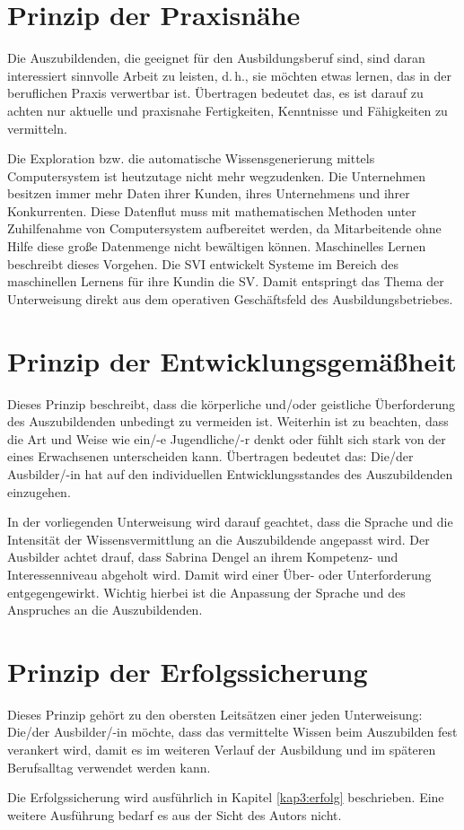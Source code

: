 \section{Prinzip der Praxisnähe}
Die Auszubildenden, die geeignet für den Ausbildungsberuf sind, sind daran interessiert sinnvolle Arbeit zu leisten, d.\,h., sie möchten etwas lernen, das in der beruflichen Praxis verwertbar ist. Übertragen bedeutet das, es ist darauf zu achten nur aktuelle und praxisnahe Fertigkeiten, Kenntnisse und Fähigkeiten zu vermitteln. 
\par
Die Exploration bzw. die automatische Wissensgenerierung mittels Computersystem ist heutzutage nicht mehr wegzudenken. Die Unternehmen besitzen immer mehr Daten ihrer Kunden, ihres Unternehmens und ihrer Konkurrenten.\autocite[vgl.][]{noauthor_hochschule_nodate}\autocite[vgl.][]{noauthor_volkswagen_nodate} Diese Datenflut muss mit mathematischen Methoden unter Zuhilfenahme von Computersystem aufbereitet werden, da Mitarbeitende ohne Hilfe diese große Datenmenge nicht bewältigen können. Maschinelles Lernen beschreibt dieses Vorgehen. Die \ac{SVI} entwickelt Systeme im Bereich des maschinellen Lernens für ihre Kundin die \ac{SV}. Damit entspringt das Thema der Unterweisung direkt aus dem operativen Geschäftsfeld des Ausbildungsbetriebes. 

\section{Prinzip der Entwicklungsgemäßheit}
Dieses Prinzip beschreibt, dass die körperliche und/oder geistliche Überforderung des Auszubildenden unbedingt zu vermeiden ist. Weiterhin ist zu beachten, dass die Art und Weise wie ein/-e Jugendliche/-r denkt oder fühlt sich stark von der eines Erwachsenen unterscheiden kann. Übertragen bedeutet das: Die/der Ausbilder/-in hat auf den individuellen Entwicklungsstandes des Auszubildenden einzugehen. 
\par
In der vorliegenden Unterweisung wird darauf geachtet, dass die Sprache und die Intensität der Wissensvermittlung an die Auszubildende angepasst wird. Der Ausbilder achtet drauf, dass Sabrina Dengel an ihrem Kompetenz- und Interessenniveau abgeholt wird. Damit wird einer Über- oder Unterforderung entgegengewirkt. Wichtig hierbei ist die Anpassung der Sprache und des Anspruches an die Auszubildenden.

\section{Prinzip der Erfolgssicherung}
Dieses Prinzip gehört zu den obersten Leitsätzen einer jeden Unterweisung: Die/der Ausbilder/-in möchte, dass das vermittelte Wissen beim Auszubilden fest verankert wird, damit es im weiteren Verlauf der Ausbildung und im späteren Berufsalltag verwendet werden kann. 
\par
Die Erfolgssicherung wird ausführlich in Kapitel \vref{kap3:erfolg} beschrieben. Eine weitere Ausführung bedarf es aus der Sicht des Autors nicht.


